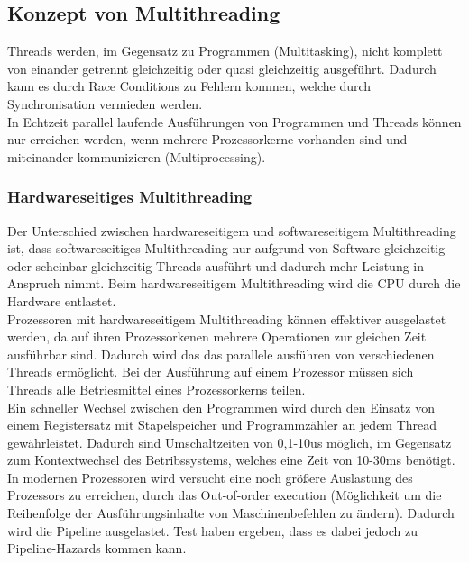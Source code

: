 \documentclass[12pt,a4paper]{report}
\begin{document}
\subsection{Konzept von Multithreading}
Threads werden, im Gegensatz zu Programmen (Multitasking), nicht komplett von einander getrennt gleichzeitig oder quasi gleichzeitig ausgeführt. Dadurch kann es durch Race Conditions zu Fehlern kommen, welche durch Synchronisation vermieden werden.\\ 
In Echtzeit parallel laufende Ausführungen von Programmen und Threads können nur erreichen werden, wenn mehrere Prozessorkerne vorhanden sind und miteinander kommunizieren (Multiprocessing).

\subsubsection{Hardwareseitiges Multithreading}
Der Unterschied zwischen hardwareseitigem und softwareseitigem Multithreading ist, dass softwareseitiges Multithreading nur aufgrund von Software gleichzeitig oder scheinbar gleichzeitig Threads ausführt und dadurch mehr Leistung in Anspruch nimmt. Beim hardwareseitigem  Multithreading wird die CPU durch die Hardware entlastet.\\

Prozessoren mit hardwareseitigem Multithreading können effektiver ausgelastet werden, da auf ihren Prozessorkenen mehrere Operationen zur gleichen Zeit ausführbar sind. Dadurch wird das das parallele ausführen von verschiedenen Threads ermöglicht. Bei der Ausführung auf einem Prozessor müssen sich Threads alle Betriesmittel eines Prozessorkerns teilen.\\

Ein schneller Wechsel zwischen den Programmen wird durch den Einsatz von einem Registersatz mit Stapelspeicher und Programmzähler an jedem Thread gewährleistet. Dadurch sind Umschaltzeiten von 0,1-10us möglich, im Gegensatz zum Kontextwechsel des Betribssystems, welches eine Zeit von 10-30ms benötigt.\\

In modernen Prozessoren wird versucht eine noch größere Auslastung des Prozessors zu erreichen, durch das Out-of-order execution (Möglichkeit um die Reihenfolge der Ausführungsinhalte von Maschinenbefehlen zu ändern). Dadurch wird die Pipeline ausgelastet. Test haben ergeben, dass es dabei jedoch zu Pipeline-Hazards kommen kann.
\end{document}
